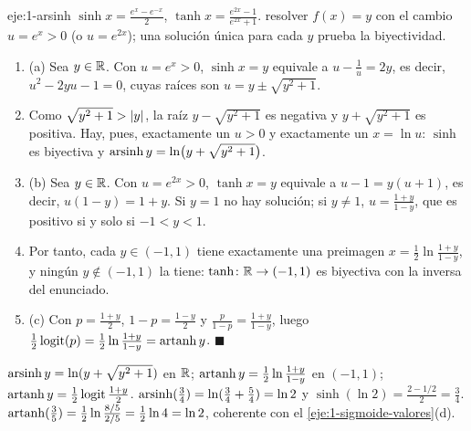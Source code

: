 \begin{solucion}{eje:1-arsinh}
\datos $\sinh x=\frac{e^{x}-e^{-x}}{2}$, $\tanh x=\frac{e^{2x}-1}{e^{2x}+1}$.
\planteamiento resolver $f(x)=y$ con el cambio $u=e^{x}>0$ (o $u=e^{2x}$); una solución única para cada $y$ prueba la biyectividad.
\pasos
\begin{enumerate}[label=\arabic*.]
  \item (a) Sea $y\in\mathbb{R}$. Con $u=e^{x}>0$, $\sinh x=y$ equivale a $u-\frac1u=2y$, es decir, $u^{2}-2yu-1=0$, cuyas raíces son $u=y\pm\sqrt{y^{2}+1}$.
  \item Como $\sqrt{y^{2}+1}>\lvert y\rvert$, la raíz $y-\sqrt{y^{2}+1}$ es negativa y $y+\sqrt{y^{2}+1}$ es positiva. Hay, pues, exactamente un $u>0$ y exactamente un $x=\ln u$: $\sinh$ es biyectiva y $\operatorname{arsinh} y=\ln\bigl(y+\sqrt{y^{2}+1}\bigr)$.
  \item (b) Sea $y\in\mathbb{R}$. Con $u=e^{2x}>0$, $\tanh x=y$ equivale a $u-1=y(u+1)$, es decir, $u(1-y)=1+y$. Si $y=1$ no hay solución; si $y\ne1$, $u=\frac{1+y}{1-y}$, que es positivo si y solo si $-1<y<1$.
  \item Por tanto, cada $y\in(-1,1)$ tiene exactamente una preimagen $x=\frac12\ln\frac{1+y}{1-y}$, y ningún $y\notin(-1,1)$ la tiene: $\tanh\colon\mathbb{R}\to(-1,1)$ es biyectiva con la inversa del enunciado.
  \item (c) Con $p=\frac{1+y}{2}$, $1-p=\frac{1-y}{2}$ y $\frac{p}{1-p}=\frac{1+y}{1-y}$, luego $\frac12\operatorname{logit}(p)=\frac12\ln\frac{1+y}{1-y}=\operatorname{artanh} y$. \hfill$\blacksquare$
\end{enumerate}
\resultado $\operatorname{arsinh} y=\ln(y+\sqrt{y^{2}+1})$ en $\mathbb{R}$; $\operatorname{artanh} y=\frac12\ln\frac{1+y}{1-y}$ en $(-1,1)$; $\operatorname{artanh} y=\frac12\operatorname{logit}\frac{1+y}{2}$.
\comprobacion $\operatorname{arsinh}(\frac34)=\ln(\frac34+\frac54)=\ln2$ y $\sinh(\ln2)=\frac{2-1/2}{2}=\frac34$. $\operatorname{artanh}(\frac35)=\frac12\ln\frac{8/5}{2/5}=\frac12\ln4=\ln2$, coherente con el \cref{eje:1-sigmoide-valores}(d).
\end{solucion}

